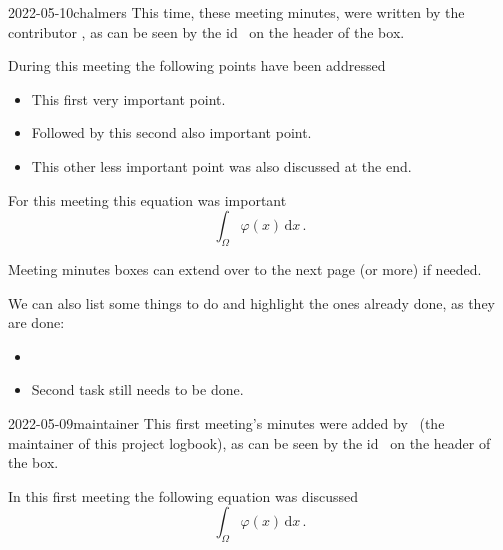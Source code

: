 \documentclass{project-logbook}
\begin{document}
		\begin{MeetingMinutes}{2022-05-10}{chalmers}
			This time, these meeting minutes, were written by the contributor , as can be seen by the id \emph{}~on the header of the box.

			During this meeting the following points have been addressed
			\begin{itemize}
				\item This first very important point.
				\item Followed by this second also important point.
				\item This other less important point was also discussed at the end.
			\end{itemize}

			For this meeting this equation was important
			\begin{equation}
				\int_{\Omega}{\varphi(x)}\,\mathrm{d}x\,.
			\end{equation}
			\lipsum[2]

			\begin{HighlightedNote}{}
				Meeting minutes boxes can extend over to the next page (or more) if needed.
			\end{HighlightedNote}

			We can also list some things to do and highlight the ones already done, as they are done:
			\begin{itemize}
				\item {}
				\item Second task still needs to be done.
			\end{itemize}
		\end{MeetingMinutes}


		\begin{MeetingMinutes}{2022-05-09}{maintainer}
			This first meeting's minutes were added by \MaintainerName~(the maintainer of this project logbook), as can be seen by the id \emph{\Maintainerid}~on the header of the box.

			In this first meeting the following equation was discussed
			\begin{equation}
				\int_{\Omega}{\varphi(x)}\,\mathrm{d}x\,.
			\end{equation}
			\lipsum[1]
		\end{MeetingMinutes}
\end{document}
